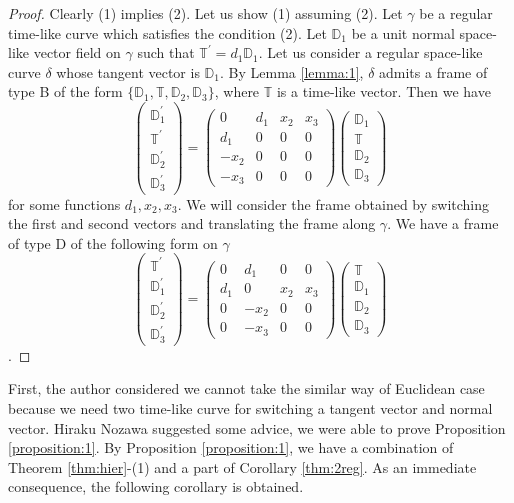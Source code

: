 \documentclass[a4paper]{amsart}
\theoremstyle{definition}
\theoremstyle{remark}
\newcommand{\DD}{\mathbb{D}}
\newcommand{\TT}{\mathbb{T}}
\numberwithin{equation}{section}
\begin{document}
\begin{proof}
Clearly (1) implies (2). Let us show (1) assuming (2). Let $\gamma$ be a regular time-like curve which satisfies the condition (2). Let $\DD_{1}$ be a unit normal space-like vector field on $\gamma$ such that $\TT^{\prime}=d_{1}\DD_{1}$. Let us consider a regular space-like curve $\delta$ whose tangent vector is $\DD_{1}$. By Lemma \ref{lemma:1}, $\delta$ admits a frame of type B of the form $\{\DD_{1}, \TT, \DD_{2}, \DD_{3}\}$, where $\TT$ is a time-like vector. Then we have
\[\begin{pmatrix}
\DD_{1}^{\prime}\\
\TT^{\prime}\\
\DD_{2}^{\prime}\\
\DD_{3}^{\prime}
\end{pmatrix}=\begin{pmatrix}
0&d_{1}&x_{2}&x_{3}\\
d_{1}&0&0&0\\
-x_{2}&0&0&0\\
-x_{3}&0&0&0
\end{pmatrix}\begin{pmatrix}
\DD_{1}\\
\TT\\
\DD_{2}\\
\DD_{3}
\end{pmatrix}\]
for some functions $d_{1}, x_{2}, x_{3}$. We will consider the frame obtained by switching the first and second vectors and translating the frame along $\gamma$. We have a frame of type D of the following form on $\gamma$
\[\begin{pmatrix}
\TT^{\prime}\\
\DD_{1}^{\prime}\\
\DD_{2}^{\prime}\\
\DD_{3}^{\prime}
\end{pmatrix}=\begin{pmatrix}
0&d_{1}&0&0\\
d_{1}&0&x_{2}&x_{3}\\
0&-x_{2}&0&0\\
0&-x_{3}&0&0
\end{pmatrix}\begin{pmatrix}
\TT\\
\DD_{1}\\
\DD_{2}\\
\DD_{3}
\end{pmatrix}\].
\end{proof}
First, the author considered  we cannot take the similar way of Euclidean case because we need two time-like curve for switching a tangent vector and normal vector. Hiraku Nozawa suggested some advice, we were able to prove Proposition \ref{proposition:1}. By Proposition \ref{proposition:1}, we have a combination of Theorem \ref{thm:hier}-(1) and a part of Corollary \ref{thm:2reg}. As an immediate consequence, the following corollary is obtained.
\end{document}
